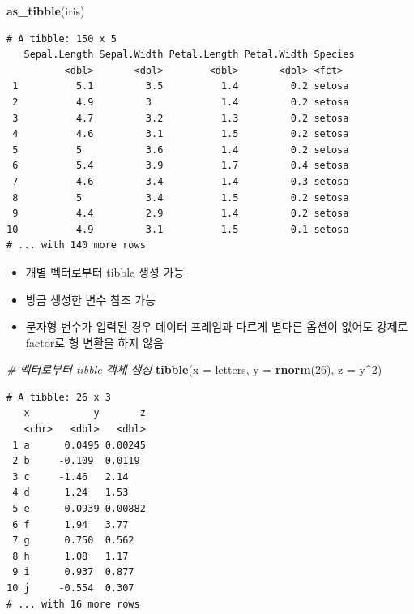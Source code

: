 \documentclass[
  11pt,
]{krantz}
\newenvironment{Shaded}{\begin{snugshade}}{\end{snugshade}}
\newcommand{\CommentTok}[1]{\textcolor[rgb]{0.37,0.37,0.37}{\textit{#1}}}
\newcommand{\DataTypeTok}[1]{\textcolor[rgb]{0.27,0.27,0.27}{#1}}
\newcommand{\DecValTok}[1]{\textcolor[rgb]{0.06,0.06,0.06}{#1}}
\newcommand{\KeywordTok}[1]{\textcolor[rgb]{0.27,0.27,0.27}{\textbf{#1}}}
\newcommand{\NormalTok}[1]{#1}
\newcommand{\OperatorTok}[1]{\textcolor[rgb]{0.43,0.43,0.43}{\textbf{#1}}}
\providecommand{\tightlist}{%
  \setlength{\itemsep}{0pt}\setlength{\parskip}{0pt}}
\begin{document}
\begin{Shaded}
\begin{Highlighting}[]
\KeywordTok{as_tibble}\NormalTok{(iris)}
\end{Highlighting}
\end{Shaded}

\begin{verbatim}
# A tibble: 150 x 5
   Sepal.Length Sepal.Width Petal.Length Petal.Width Species
          <dbl>       <dbl>        <dbl>       <dbl> <fct>  
 1          5.1         3.5          1.4         0.2 setosa 
 2          4.9         3            1.4         0.2 setosa 
 3          4.7         3.2          1.3         0.2 setosa 
 4          4.6         3.1          1.5         0.2 setosa 
 5          5           3.6          1.4         0.2 setosa 
 6          5.4         3.9          1.7         0.4 setosa 
 7          4.6         3.4          1.4         0.3 setosa 
 8          5           3.4          1.5         0.2 setosa 
 9          4.4         2.9          1.4         0.2 setosa 
10          4.9         3.1          1.5         0.1 setosa 
# ... with 140 more rows
\end{verbatim}

\normalsize

\begin{itemize}
\tightlist
\item
  개별 벡터로부터 tibble 생성 가능
\item
  방금 생성한 변수 참조 가능
\item
  문자형 변수가 입력된 경우 데이터 프레임과 다르게 별다른 옵션이 없어도 강제로 factor로 형 변환을 하지 않음
\end{itemize}

\footnotesize

\begin{Shaded}
\begin{Highlighting}[]
\CommentTok{# 벡터로부터 tibble 객체 생성}
\KeywordTok{tibble}\NormalTok{(}\DataTypeTok{x =}\NormalTok{ letters, }\DataTypeTok{y =} \KeywordTok{rnorm}\NormalTok{(}\DecValTok{26}\NormalTok{), }\DataTypeTok{z =}\NormalTok{ y}\OperatorTok{^}\DecValTok{2}\NormalTok{)}
\end{Highlighting}
\end{Shaded}

\begin{verbatim}
# A tibble: 26 x 3
   x           y       z
   <chr>   <dbl>   <dbl>
 1 a      0.0495 0.00245
 2 b     -0.109  0.0119 
 3 c     -1.46   2.14   
 4 d      1.24   1.53   
 5 e     -0.0939 0.00882
 6 f      1.94   3.77   
 7 g      0.750  0.562  
 8 h      1.08   1.17   
 9 i      0.937  0.877  
10 j     -0.554  0.307  
# ... with 16 more rows
\end{verbatim}
\end{document}
